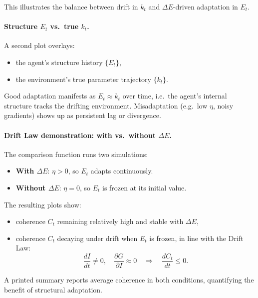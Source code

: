 \documentclass[12pt,a4paper]{report}
\begin{document}
This illustrates the balance between drift in \(k_t\) and $\Delta E$-driven adaptation in \(E_t\).

\paragraph{Structure \(E_t\) vs.\ true \(k_t\).}

A second plot overlays:

\begin{itemize}[leftmargin=2em]
    \item the agent's structure history \(\{E_t\}\),
    \item the environment's true parameter trajectory \(\{k_t\}\).
\end{itemize}

Good adaptation manifests as \(E_t \approx k_t\) over time, i.e.\ the agent's internal structure tracks the drifting environment. Misadaptation (e.g.\ low \(\eta\), noisy gradients) shows up as persistent lag or divergence.

\paragraph{Drift Law demonstration: with vs.\ without \texorpdfstring{$\Delta E$}{ΔE}.}

The comparison function runs two simulations:

\begin{itemize}[leftmargin=2em]
    \item \textbf{With $\Delta E$}: \(\eta > 0\), so \(E_t\) adapts continuously.
    \item \textbf{Without $\Delta E$}: \(\eta = 0\), so \(E_t\) is frozen at its initial value.
\end{itemize}

The resulting plots show:

\begin{itemize}[leftmargin=2em]
    \item coherence \(C_t\) remaining relatively high and stable with $\Delta E$,
    \item coherence \(C_t\) decaying under drift when \(E_t\) is frozen, in line with the Drift Law:
    \[
        \frac{d I}{dt} \neq 0, \quad \frac{\partial G}{\partial I} \approx 0 \quad \Rightarrow \quad \frac{d C_t}{dt} \le 0.
    \]
\end{itemize}

A printed summary reports average coherence in both conditions, quantifying the benefit of structural adaptation.
\end{document}
